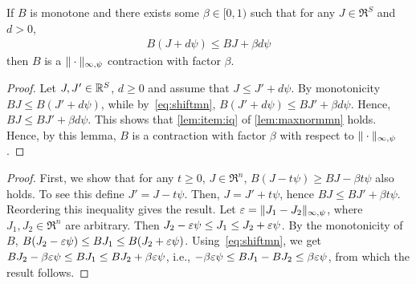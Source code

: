 \begin{corollary}
\label{maxnormmn}
\label{cor:maxnormmn}
If $B$ is monotone and there exists some $\beta\in [0,1)$ such that for any $J\in \Re^S$ and $d>0$,
\begin{align}
\label{eq:shiftmn}
B( J + d \psi) \le B J + \beta d \psi
\end{align} 
then $B$ is a $\|\cdot\|_{\infty,\psi}$ contraction with factor $\beta$.
\end{corollary}
\begin{proof}
Let $J,J'\in \mathbb{R}^S$, $d\ge 0$ and assume that $J\le J' + d \psi$. By monotonicity $BJ \le B(J'+ d \psi)$, while
by~\eqref{eq:shiftmn}, $B(J'+d\psi) \le BJ' + \beta d \psi$. Hence, $BJ \le BJ' + \beta d \psi$. 
This shows that \eqref{lem:item:iq} of \cref{lem:maxnormmn} holds. Hence, by this lemma, $B$ is a contraction with factor $\beta$ with respect to $\|\cdot\|_{\infty,\psi}$.
\end{proof}
\begin{proof}
First, we show that for any $t\ge 0$,  $J\in \Re^n$,
$B( J - t \psi) \ge B J - \beta t \psi$ also holds.
To see this define $J' = J-t\psi$. Then, $J = J'+t\psi$, hence $B J \le B J' + \beta t \psi$. Reordering this inequality gives the result.
Let $\varepsilon = \|J_1 - J_2\|_{\infty,\psi}$, where $J_1,J_2\in \Re^n$ are arbitrary.
Then $J_2 - \varepsilon \psi \le J_1 \le J_2 + \varepsilon \psi$. 
By the monotonicity of $B$,
$B(J_2 - \varepsilon \psi) \le B J_1 \le B(J_2 + \varepsilon \psi)$. 
Using~\eqref{eq:shiftmn}, we get 
$B J_2 - \beta \varepsilon \psi \le B J_1 \le B J_2 + \beta \varepsilon \psi$, i.e., $-\beta \varepsilon \psi \le B J_1 - B J_2 \le \beta \varepsilon \psi$, from which the result follows.
\end{proof}
\fi

